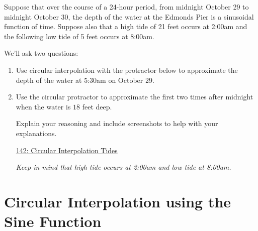 \documentclass{ximera}
\begin{document}
\begin{example}  \label{E888GGGbdsdsf}
Suppose that over the course of a 24-hour period, from midnight October 29 to midnight October 30, the depth of the water at the Edmonds Pier is a sinusoidal function of time. Suppose also that a high tide of 21 feet occurs at 2:00am and the following low tide of 5 feet occurs at 8:00am. 

We'll ask two questions:

\begin{enumerate}
\item Use circular interpolation with the protractor below to approximate the depth of the water at 5:30am on October 29.

\item Use the circular protractor to approximate the first two times after midnight when the water is $18$ feet deep.

Explain your reasoning and include screenshots to help with your explanations.
\begin{freeResponse}
\end{freeResponse}

\begin{onlineOnly}
    \begin{center}
\end{center}
\end{onlineOnly}

\href{https://www.desmos.com/calculator/0wxwmkzvky}{142: Circular Interpolation Tides}

\emph{Keep in mind that high tide occurs at 2:00am and low tide at 8:00am.}

\end{enumerate}
\end{example}


\section{Circular Interpolation using the Sine Function}
\end{document}
